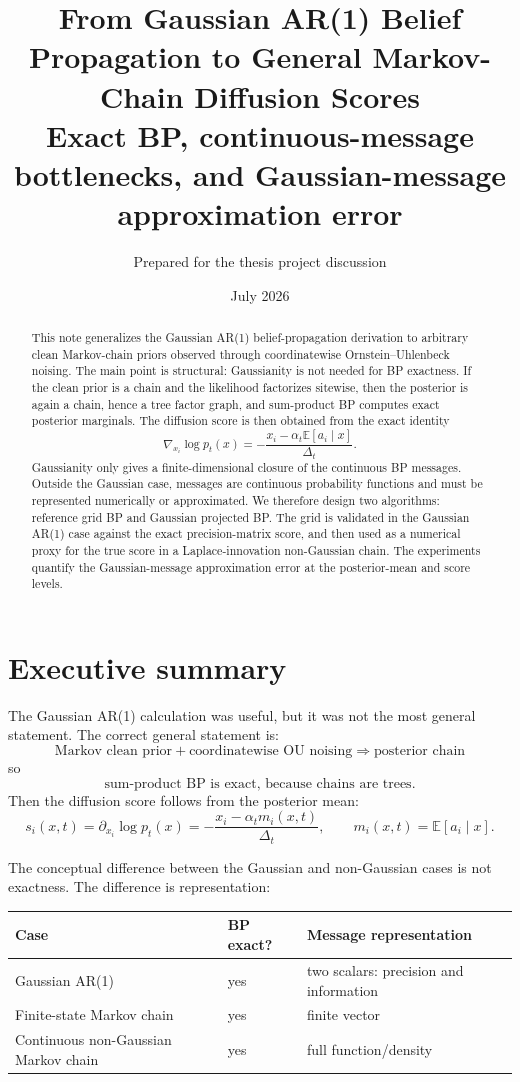 \documentclass[11pt]{article}
\title{From Gaussian AR(1) Belief Propagation to General Markov-Chain Diffusion Scores\\
\large Exact BP, continuous-message bottlenecks, and Gaussian-message approximation error}
\author{Prepared for the thesis project discussion}
\date{July 2026}
\newcommand{\E}{\mathbb{E}}
\begin{document}
\maketitle

\begin{abstract}
This note generalizes the Gaussian AR(1) belief-propagation derivation to arbitrary clean Markov-chain priors observed through coordinatewise Ornstein--Uhlenbeck noising. The main point is structural: Gaussianity is not needed for BP exactness. If the clean prior is a chain and the likelihood factorizes sitewise, then the posterior is again a chain, hence a tree factor graph, and sum-product BP computes exact posterior marginals. The diffusion score is then obtained from the exact identity
\[
  \nabla_{x_i}\log p_t(x) = -\frac{x_i-\alpha_t\E[a_i\mid x]}{\Delta_t}.
\]
Gaussianity only gives a finite-dimensional closure of the continuous BP messages. Outside the Gaussian case, messages are continuous probability functions and must be represented numerically or approximated. We therefore design two algorithms: reference grid BP and Gaussian projected BP. The grid is validated in the Gaussian AR(1) case against the exact precision-matrix score, and then used as a numerical proxy for the true score in a Laplace-innovation non-Gaussian chain. The experiments quantify the Gaussian-message approximation error at the posterior-mean and score levels.
\end{abstract}

\tableofcontents
\newpage

\section{Executive summary}

The Gaussian AR(1) calculation was useful, but it was not the most general statement. The correct general statement is:
\[
\boxed{\text{Markov clean prior} + \text{coordinatewise OU noising}
\Rightarrow \text{posterior chain}}
\]
so
\[
\boxed{\text{sum-product BP is exact, because chains are trees}.}
\]
Then the diffusion score follows from the posterior mean:
\[
\boxed{
  s_i(x,t) = \partial_{x_i}\log p_t(x)
  = -\frac{x_i-\alpha_t m_i(x,t)}{\Delta_t},
  \qquad m_i(x,t)=\E[a_i\mid x].
}
\]

The conceptual difference between the Gaussian and non-Gaussian cases is not exactness. The difference is representation:
\begin{center}
\begin{tabular}{lll}
\toprule
Case & BP exact? & Message representation \\
\midrule
Gaussian AR(1) & yes & two scalars: precision and information \\
Finite-state Markov chain & yes & finite vector \\
Continuous non-Gaussian Markov chain & yes & full function/density \\
\bottomrule
\end{tabular}
\end{center}
\end{document}
